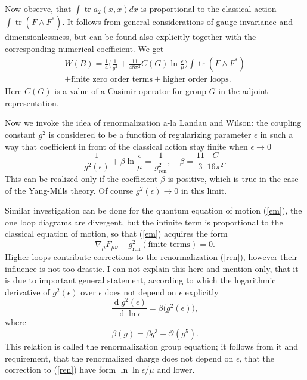 \documentclass[12pt]{article}
\DeclareMathOperator{\tr}{tr}
\DeclareMathOperator{\dd}{d}
\begin{document}
	Now observe, that
    $ \int \tr a_{2}(x,x) dx $
	is proportional to the classical action
    $ \int \tr (F \wedge F^{*}) $.
	It follows from general considerations of gauge invariance
	and dimensionlessness, but can be found also explicitly together 
	with the corresponding numerical coefficient.
	We get
\begin{equation}
\begin{split}
    W(B) = \frac{1}{4}\bigl(\frac{1}{g^{2}} + 
	    \frac{11}{48 \pi^{2}} C(G) \ln \frac{\epsilon}{\mu} \bigr) 
		\int \tr (F\wedge F^{*}) \\
    + \text{finite zero order terms} + \text{higher order loops} .
\end{split}
\end{equation}
	Here
    $ C(G) $
	is a value of a Casimir operator for group
    $ G $
	in the adjoint representation.

	Now we invoke the idea of renormalization 
	a-la Landau and Wilson:
	the coupling constant
    $ g^{2} $
	is considered to be a function of regularizing parameter
    $ \epsilon $
	in such a way that coefficient in front of the classical 
	action stay finite when
    $ \epsilon \to 0 $
\begin{equation}
\label{ren}
    \frac{1}{g^{2}(\epsilon)} + \beta \ln \frac{\epsilon}{\mu}
	= \frac{1}{g_{\text{ren}}^{2}} , \quad
	\beta = \frac{11}{3} \, \frac{C}{16 \pi^{2}} .
\end{equation}
	This can be realized only if the coefficient
    $ \beta $
	is positive, which is true in the case of the Yang-Mills theory.
	Of course
    $ g^{2}(\epsilon) \to 0 $
	in this limit.

	Similar investigation can be done for the quantum equation of motion
(\ref{em}),
	the one loop diagrams are divergent, but the infinite term
	is proportional to the classical equation of motion,
	so that
(\ref{em})
	acquires the form
\begin{equation*}
    \nabla_{\mu} F_{\mu \nu} + g_{\text{ren}}^{2} (\text{finite terms}) = 0 .
\end{equation*}
	Higher loops contribute corrections to the renormalization
(\ref{ren}),
	however their influence is not too drastic.
	I can not explain this here and mention only, that it is due to
	important general statement, according to which the 
	logarithmic derivative of
    $ g^{2}(\epsilon) $
	over
    $ \epsilon $
	does not depend on
    $ \epsilon $
	explicitly
\begin{equation*}
    \frac{\dd g^{2}(\epsilon)}{\dd \ln \epsilon} 
	= \beta \bigl(g^{2}(\epsilon) \bigr),
\end{equation*}
	where
\begin{equation*}
    \beta(g) = \beta g^{3} + \mathcal{O}(g^{5}).
\end{equation*}
	This relation is called the renormalization group
	equation; it follows from it and requirement, that
	the renormalized charge does not depend on
    $ \epsilon $,
	that the correction to
(\ref{ren})
	have form
    $ \ln \ln \epsilon / \mu $
	and lower.
\end{document}
